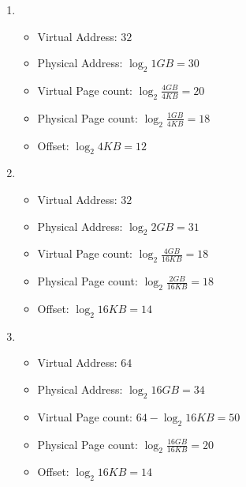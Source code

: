 \begin{latin}
    \begin{enumerate}
        \item \begin{itemize}
            \item Virtual Address: $32$
            \item Physical Address: $\log_2{1GB} = 30$
            \item Virtual Page count: $\log_2{\frac{4GB}{4KB}} = 20$
            \item Physical Page count: $\log_2{\frac{1GB}{4KB}} = 18$
            \item Offset: $\log_2{4KB} = 12$
        \end{itemize}
        \item \begin{itemize}
            \item Virtual Address: $32$
            \item Physical Address: $\log_2{2GB} = 31$
            \item Virtual Page count: $\log_2{\frac{4GB}{16KB}} = 18$
            \item Physical Page count: $\log_2{\frac{2GB}{16KB}} = 18$
            \item Offset: $\log_2{16KB} = 14$
        \end{itemize}
        \item \begin{itemize}
            \item Virtual Address: $64$
            \item Physical Address: $\log_2{16GB} = 34$
            \item Virtual Page count: $64-\log_2{16KB} = 50$
            \item Physical Page count: $\log_2{\frac{16GB}{16KB}} = 20$
            \item Offset: $\log_2{16KB} = 14$
        \end{itemize}
    \end{enumerate}
\end{latin}
